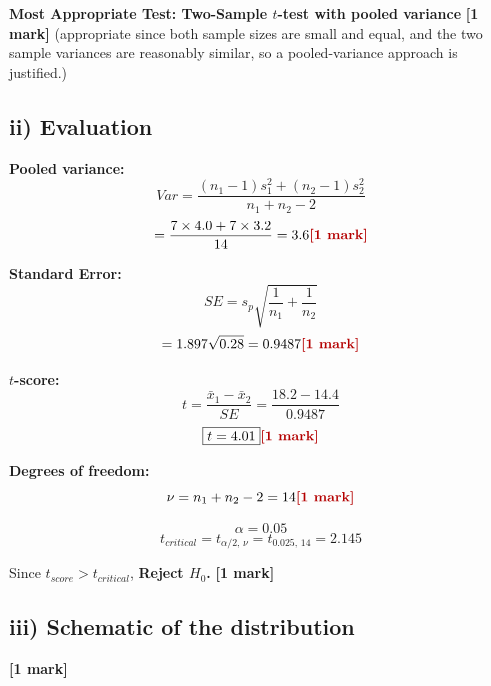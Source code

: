\documentclass[11pt]{article}
\newcommand{\mk}[1]{\hfill\textcolor{markcolor}{\textbf{[#1]}}}
\begin{document}
\textbf{Most Appropriate Test: Two-Sample $t$-test with pooled variance} \mk{1 mark}
(appropriate since both sample sizes are small and equal, and the two sample variances are reasonably similar, so a pooled-variance approach is justified.)

\subsection*{ii) Evaluation}

\textbf{Pooled variance:}
\[
Var = \frac{(n_1-1)s_1^2+(n_2-1)s_2^2}{n_1+n_2-2}
\]
\[
= \frac{7\times4.0+7\times3.2}{14} = 3.6 \mk{1 mark}
\]

\textbf{Standard Error:}
\[
SE = s_p\sqrt{\frac{1}{n_1}+\frac{1}{n_2}}
\]
\[
= 1.897\sqrt{0.28} = 0.9487 \mk{1 mark}
\]

\textbf{$t$-score:}
\[
t = \frac{\bar{x}_1-\bar{x}_2}{SE} = \frac{18.2-14.4}{0.9487}
\]
\[
\boxed{t = 4.01} \mk{1 mark}
\]

\textbf{Degrees of freedom:}
\[
\nu = n_1+n_2-2 = 14 \mk{1 mark}
\]

\[
\alpha=0.05
\]
\[
t_{critical} = t_{\alpha/2,\,\nu} = t_{0.025,\,14} = 2.145
\]

Since $t_{score} > t_{critical}$, \textbf{Reject $H_0$.} \mk{1 mark}

\subsection*{iii) Schematic of the distribution}

\begin{center}
\end{center}
\mk{1 mark}
\end{document}
